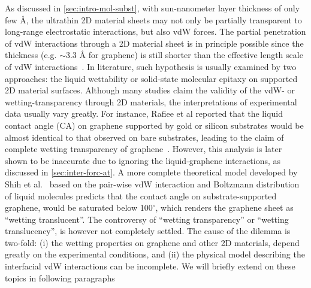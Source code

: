 As discussed in \autoref{sec:intro-mol-subst}, with sun-nanometer layer
thickness of only few \AA{}, the ultra\-thin 2D material sheets may
not only be partially transparent to long-range electrostatic
interactions, but also vdW forces.
%
The partial penetration of vdW interactions through a 2D material
sheet is in principle possible since the thickness (e.g. $\sim{}$3.3
\AA{} for graphene) is still shorter than the effective length scale
of vdW interactions~\autocite{Israelachvili_2011_book}.
%
In literature, such hypothesis is usually examined by two approaches:
the liquid wettability or solid-state molecular epitaxy on supported
2D material surfaces.
%
Although many studies claim the validity of the vdW- or
wetting-transparency through 2D materials, the interpretations of
experimental data usually vary greatly.
%
For instance, Rafiee et al reported that the liquid contact angle
(CA) on graphene supported by gold or silicon substrates would be
almost identical to that observed on bare substrates, leading to the
claim of complete wetting transparency of
graphene~\autocite{rafiee_2012_transparency}.
%
However, this analysis is later shown to be inaccurate due to
ignoring the liquid-graphene interactions, as discussed in
\autoref{sec:inter-forc-at}.
%
A more complete theoretical model developed by Shih et
al.~\autocite{Shih_2012_prl}  based on the pair-wise
vdW interaction and Boltzmann distribution of liquid molecules
predicts that the contact angle on substrate-supported graphene, would
be saturated below 100$^{\circ}$, which renders the graphene sheet as
``wetting translucent''.
%
The controversy of ``wetting transparency'' or ``wetting
translucency'', is however not completely settled.
%
The cause of the dilemma is two-fold: (i) the wetting properties on
graphene and other 2D materials, depend greatly on the experimental
conditions, and (ii) the physical model describing the interfacial vdW
interactions can be incomplete. We will briefly extend on these topics
in following paragraphs

